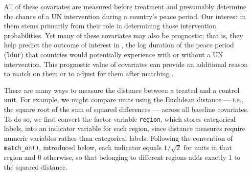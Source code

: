 \documentclass[
  12pt,
  leqno]{article}
\begin{document}
All of these covariates are measured before treatment and presumably
determine the chance of a UN intervention during a country's peace
period. Our interest in them stems primarily from their role in
determining those intervention probabilities. Yet many of these
covariates may also be prognostic; that is, they help predict the
outcome of interest in \citet{gilligansergenti2008}, the log duration of
the peace period (\texttt{ldur}) that countries would potentially
experience with or without a UN intervention. This prognostic value of
covariates can provide an additional reason to match on them
\citep{hansen2008a} or to adjust for them after matching
\citep{salesetal2018}.

There are many ways to measure the distance between a treated and a
control unit. For example, we might compare units using the Euclidean
distance --- i.e., the square root of the sum of squared differences ---
across all baseline covariates. To do so, we first convert the factor
variable \texttt{region}, which stores categorical labels, into an
indicator variable for each region, since distance measures require
numeric variables rather than categorical labels. Following the
convention of \texttt{match\_on()}, introduced below, each indicator
equals \(1/\sqrt{2}\) for units in that region and \(0\) otherwise, so
that belonging to different regions adds exactly \(1\) to the squared
distance.

\singlespacing
\end{document}
